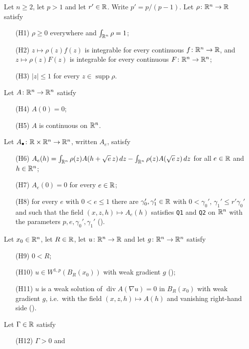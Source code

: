 \begin{helper}
Let $n\ge2$, let $p>1$ and let $r'\in\mathbb{R}$.  Write $p'=p/(p-1)$.  Let $\rho\colon\mathbb{R}^n\to\mathbb{R}$ satisfy
\begin{enumerate}
\item[(H1)] $\rho\ge0$ everywhere and $\int_{\mathbb{R}^n}\rho=1$;
\item[(H2)] $z\mapsto\rho(z)f(z)$ is integrable for every continuous
  $f\colon\mathbb{R}^n\to\mathbb{R}$, and $z\mapsto\rho(z)F(z)$ is integrable for every
  continuous $F\colon\mathbb{R}^n\to\mathbb{R}^n$;
\item[(H3)] $|z|\le1$ for every $z\in\operatorname{supp}\rho$.
\end{enumerate}
Let $A\colon\mathbb{R}^n\to\mathbb{R}^n$ satisfy
\begin{enumerate}
\item[(H4)] $A(0)=0$;
\item[(H5)] $A$ is continuous on $\mathbb{R}^n$.
\end{enumerate}
Let $A_\bullet\colon\mathbb{R}\times\mathbb{R}^n\to\mathbb{R}^n$, written $A_e$, satisfy
\begin{enumerate}
\item[(H6)] $A_e(h)=\int_{\mathbb{R}^n}\rho(z)A(h+\sqrt e\,z)\,dz
  -\int_{\mathbb{R}^n}\rho(z)A(\sqrt e\,z)\,dz$ for all $e\in\mathbb{R}$ and $h\in\mathbb{R}^n$;
\item[(H7)] $A_e(0)=0$ for every $e\in\mathbb{R}$;
\item[(H8)] for every $e$ with $0<e\le1$ there are $\gamma_0',\gamma_1'\in\mathbb{R}$
  with $0<\gamma_0'$, $\gamma_1'\le r'\gamma_0'$ and such that the field
  $(x,z,h)\mapsto A_e(h)$ satisfies \texttt{Q1} and \texttt{Q2} on $\mathbb{R}^n$ with
  the parameters $p,e,\gamma_0',\gamma_1'$
  ().
\end{enumerate}
Let $x_0\in\mathbb{R}^n$, let $R\in\mathbb{R}$, let $u\colon\mathbb{R}^n\to\mathbb{R}$ and let
$g\colon\mathbb{R}^n\to\mathbb{R}^n$ satisfy
\begin{enumerate}
\item[(H9)] $0<R$;
\item[(H10)] $u\in W^{1,p}(B_R(x_0))$ with weak gradient $g$
  ();
\item[(H11)] $u$ is a weak solution of $\operatorname{div}A(\nabla u)=0$ in
  $B_R(x_0)$ with weak gradient $g$, i.e.\ with the field
  $(x,z,h)\mapsto A(h)$ and vanishing right-hand side
  ().
\end{enumerate}
Let $\Gamma\in\mathbb{R}$ satisfy
\begin{enumerate}
\item[(H12)] $\Gamma>0$ and

\end{enumerate}
\end{helper}
